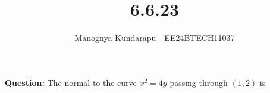 \documentclass[journal]{IEEEtran}
\begin{document}

\vspace{3cm}

\title{6.6.23}
\author{Manognya Kundarapu - EE24BTECH11037
}
{\let\newpage\relax\maketitle}

\renewcommand{\thefigure}{\theenumi}
\renewcommand{\thetable}{\theenumi}
\setlength{\intextsep}{10pt} %


\renewcommand{\thetable}{\theenumi}
\textbf{Question:} The normal to the curve $x^2=4y$ passing through $(1,2)$ is
\end{document}
